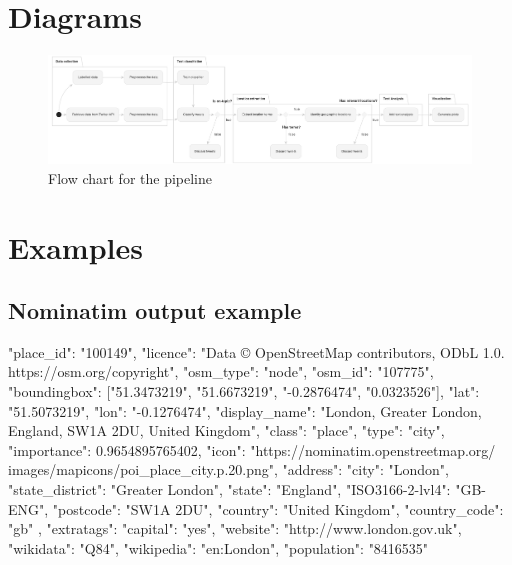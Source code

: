 \appendix
\chapter{Diagrams}\label{appendix:raw}
\begin{figure}
\begin{center}
  \includegraphics[angle=90, width=\dimexpr\textwidth-11cm\relax, height=\textheight, keepaspectratio]{./images/pipeline.png}
\end{center}
\caption{Flow chart for the pipeline}
\label{fig:flow_chart_big}
\end{figure}

\chapter{Examples}\label{appendix:examples}
\section*{Nominatim output example}
 \begin{verbnobox}[\fontsize{12pt}{12pt}\selectfont]
  {
    "place_id": "100149",
    "licence": "Data © OpenStreetMap contributors, 
                ODbL 1.0. https://osm.org/copyright",
    "osm_type": "node",
    "osm_id": "107775",
    "boundingbox": ["51.3473219", "51.6673219", 
                    "-0.2876474", "0.0323526"],
    "lat": "51.5073219",
    "lon": "-0.1276474",
    "display_name": "London, Greater London, England, 
                     SW1A 2DU, United Kingdom",
    "class": "place",
    "type": "city",
    "importance": 0.9654895765402,
    "icon": "https://nominatim.openstreetmap.org/
             images/mapicons/poi_place_city.p.20.png",
    "address": {
      "city": "London",
      "state_district": "Greater London",
      "state": "England",
      "ISO3166-2-lvl4": "GB-ENG",
      "postcode": "SW1A 2DU",
      "country": "United Kingdom",
      "country_code": "gb"
    },
    "extratags": {
      "capital": "yes",
      "website": "http://www.london.gov.uk",
      "wikidata": "Q84",
      "wikipedia": "en:London",
      "population": "8416535"
    }
  }                           
  \end{verbnobox}
                
